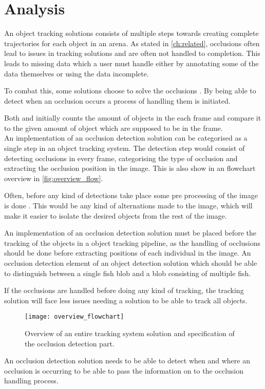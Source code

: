 \graphicspath{{figures/analysis/}}
\chapter{Analysis}\label{ch:analysis}
An object tracking solutions consists of multiple steps towards creating complete trajectories for each object in an arena. As stated in \autoref{ch:related}, occlusions often lead to issues in tracking solutions and are often not handled to completion. This leads to missing data which a user must handle either by annotating some of the data themselves or using the data incomplete.

To combat this, some solutions choose to solve the occlusions \citep{Romero-Ferrero2019, Dolado2015}. By being able to detect when an occlusion occurs a process of handling them is initiated.

Both \cite{Romero-Ferrero2019} and \cite{Dolado2015} initially counts the amount of objects in the each frame and compare it to the given amount of object which are supposed to be in the frame.\\

An implementation of an occlusion detection solution can be categorised as a single step in an object tracking system. The detection step would consist of detecting occlusions in every frame, categorising the type of occlusion and extracting the occlusion position in the image. This is also show in an flowchart overview in \autoref{fig:overview_flow}.

Often, before any kind of detections take place some pre processing of the image is done \citep{Delcourt2018}. This would be any kind of alternations made to the image, which will make it easier to isolate the desired objects from the rest of the image.

An implementation of an occlusion detection solution must be placed before the tracking of the objects in a object tracking pipeline, as the handling of occlusions should be done before extracting positions of each individual in the image. An occlusion detection element of an object detection solution which should be able to distinguish between a single fish \gls{blob} and a \gls{blob} consisting of multiple fish.

If the occlusions are handled before doing any kind of tracking, the tracking solution will face less issues needing a solution to be able to track all objects.

\begin{figure}[H]
	\centering
	\texttt{[image: overview\_flowchart]}
	\caption{Overview of an entire tracking system solution and specification of the occlusion detection part.}
	\label{fig:overview_flow}
\end{figure}

An occlusion detection solution needs to be able to detect when and where an occlusion is occurring to be able to pass the information on to the occlusion handling process.
